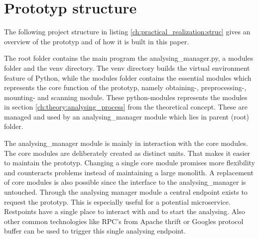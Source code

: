 \section{Prototyp structure}
\label{ch:practical_realization:prot_struct}
The following project structure in listing \ref{ch:practical_realization:struc} gives an overview of the prototyp and of how it is built in this paper.


The root folder contains the main program the analysing\_manager.py, a modules folder and the venv directory.
The venv directory builds the virtual environment feature of Python, while the modules folder contains the essential modules which represents the core function of the prototyp, namely obtaining-, preprocessing-, mounting- and scanning module. These python-modules represents the modules in section \ref{ch:theory:analysing_process} from the theoretical concept. These are managed and used by an analysing\_manager module which lies in parent (root) folder. 

The analysing\_manager module is mainly in interaction with the core modules. The core modules are deliberately created as distinct units. That makes it easier to maintain the prototyp. Changing a single core module promises more flexibility and counteracts problems instead of maintaining a large monolith. A replacement of core modules is also possible since the interface to the analysing\_manager is untouched.
Through the analysing manager module a central endpoint exists to request the prototyp. This is especially useful for a potential microservice. Restpoints have a single place to interact with and to start the analysing. Also other common technologies like RPC's from Apache thrift or Googles protocol buffer can be used to trigger this single analysing endpoint. 

